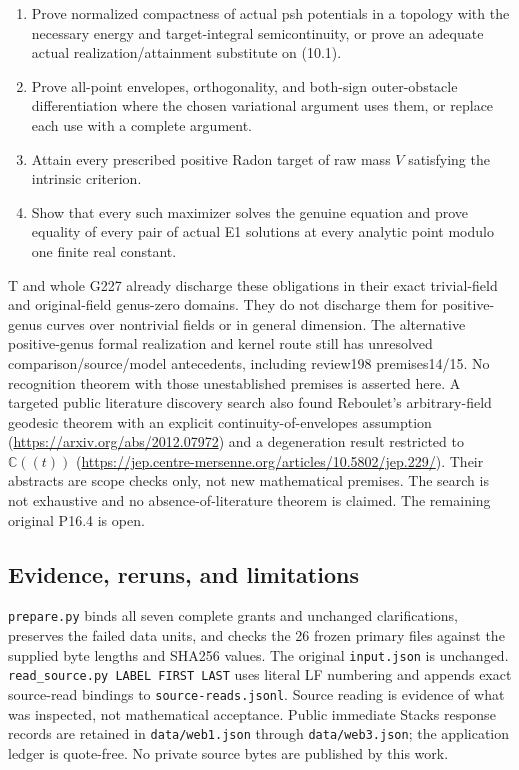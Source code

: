 \documentclass[
  11pt,
]{article}
\providecommand{\tightlist}{%
  \setlength{\itemsep}{0pt}\setlength{\parskip}{0pt}}
\begin{document}
\begin{enumerate}
\def\labelenumi{\arabic{enumi}.}
\tightlist
\item
  Prove normalized compactness of actual psh potentials in a topology
  with the necessary energy and target-integral semicontinuity, or prove
  an adequate actual realization/attainment substitute on (10.1).
\item
  Prove all-point envelopes, orthogonality, and both-sign outer-obstacle
  differentiation where the chosen variational argument uses them, or
  replace each use with a complete argument.
\item
  Attain every prescribed positive Radon target of raw mass \(V\)
  satisfying the intrinsic criterion.
\item
  Show that every such maximizer solves the genuine equation and prove
  equality of every pair of actual E1 solutions at every analytic point
  modulo one finite real constant.
\end{enumerate}

T and whole G227 already discharge these obligations in their exact
trivial-field and original-field genus-zero domains. They do not
discharge them for positive-genus curves over nontrivial fields or in
general dimension. The alternative positive-genus formal realization and
kernel route still has unresolved comparison/source/model antecedents,
including review198 premises14/15. No recognition theorem with those
unestablished premises is asserted here. A targeted public literature
discovery search also found Reboulet's arbitrary-field geodesic theorem
with an explicit continuity-of-envelopes assumption
(\url{https://arxiv.org/abs/2012.07972}) and a degeneration result
restricted to \(\mathbb C((t))\)
(\url{https://jep.centre-mersenne.org/articles/10.5802/jep.229/}). Their
abstracts are scope checks only, not new mathematical premises. The
search is not exhaustive and no absence-of-literature theorem is
claimed. The remaining original P16.4 is open.

\subsection{Evidence, reruns, and
limitations}\label{evidence-reruns-and-limitations}

\texttt{prepare.py} binds all seven complete grants and unchanged
clarifications, preserves the failed data units, and checks the 26
frozen primary files against the supplied byte lengths and SHA256
values. The original \texttt{input.json} is unchanged.
\texttt{read\_source.py\ LABEL\ FIRST\ LAST} uses literal LF numbering
and appends exact source-read bindings to \texttt{source-reads.jsonl}.
Source reading is evidence of what was inspected, not mathematical
acceptance. Public immediate Stacks response records are retained in
\texttt{data/web1.json} through \texttt{data/web3.json}; the application
ledger is quote-free. No private source bytes are published by this
work.
\end{document}
